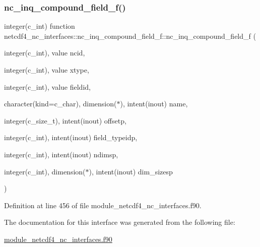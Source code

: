 \subsubsection{\texorpdfstring{nc\+\_\+inq\+\_\+compound\+\_\+field\+\_\+f()}{nc\_inq\_compound\_field\_f()}}
{\footnotesize\ttfamily integer(c\+\_\+int) function netcdf4\+\_\+nc\+\_\+interfaces\+::nc\+\_\+inq\+\_\+compound\+\_\+field\+\_\+f\+::nc\+\_\+inq\+\_\+compound\+\_\+field\+\_\+f (\begin{DoxyParamCaption}\item[{integer(c\+\_\+int), value}]{ncid,  }\item[{integer(c\+\_\+int), value}]{xtype,  }\item[{integer(c\+\_\+int), value}]{fieldid,  }\item[{character(kind=c\+\_\+char), dimension($\ast$), intent(inout)}]{name,  }\item[{integer(c\+\_\+size\+\_\+t), intent(inout)}]{offsetp,  }\item[{integer(c\+\_\+int), intent(inout)}]{field\+\_\+typeidp,  }\item[{integer(c\+\_\+int), intent(inout)}]{ndimsp,  }\item[{integer(c\+\_\+int), dimension($\ast$), intent(inout)}]{dim\+\_\+sizesp }\end{DoxyParamCaption})}



Definition at line 456 of file module\+\_\+netcdf4\+\_\+nc\+\_\+interfaces.\+f90.



The documentation for this interface was generated from the following file\+:\begin{DoxyCompactItemize}
\item 
\hyperlink{module__netcdf4__nc__interfaces_8f90}{module\+\_\+netcdf4\+\_\+nc\+\_\+interfaces.\+f90}\end{DoxyCompactItemize}

